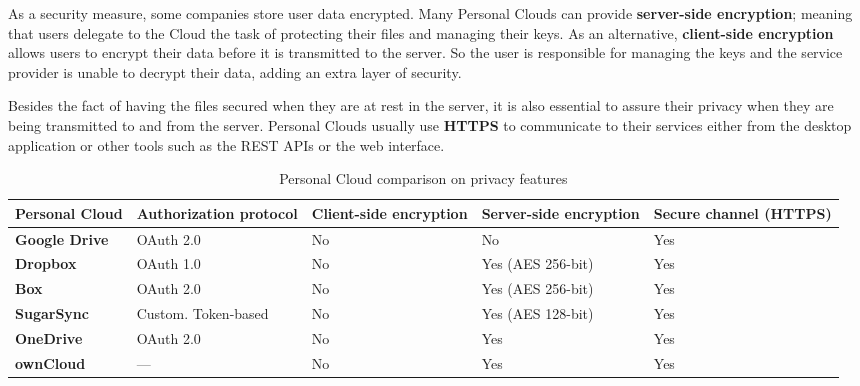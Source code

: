 As a security measure, some companies store user data encrypted. Many Personal Clouds can provide \textbf{server-side encryption}; meaning that users delegate to the Cloud the task of protecting their files and managing their keys. As an alternative, \textbf{client-side encryption} allows users to encrypt their data before it is transmitted to the server. So the user is responsible for managing the keys and the service provider is unable to decrypt their data, adding an extra layer of security.

Besides the fact of having the files secured when they are at rest in the server, it is also essential to assure their privacy when they are being transmitted to and from the server. Personal Clouds usually use \textbf{HTTPS} to communicate to their services either from the desktop application or other tools such as the REST APIs or the web interface.


{
\def\arraystretch{1.5}

\begin{table}
\begin{center}
    \begin{tabular}{ | p{3.3cm} | p{2.5cm} | p{2.2cm} | p{2.2cm} | p{2cm} | }
    \hline
    \rowcolor[gray]{0.8}

	\textbf{Personal Cloud} &
	\textbf{Authorization protocol} &
	\textbf{Client-side encryption} &
	\textbf{Server-side encryption} & 
	\textbf{Secure channel (HTTPS)} \\ \hline
	
	\textbf{Google Drive} &
	OAuth 2.0 &
	No &
	No &
	Yes \\ \hline

	\textbf{Dropbox} &
	OAuth 1.0 &
	No &
	Yes (AES 256-bit) &
	Yes \\ \hline
	
	\textbf{Box} &
	OAuth 2.0 &
	No &
	Yes (AES 256-bit) &
	Yes \\ \hline
	
	\textbf{SugarSync} & 
	Custom. Token-based &
	No &
	Yes (AES 128-bit) &
	Yes \\ \hline
	
	\textbf{OneDrive} & 
	OAuth 2.0 &
	No &
	Yes &
	Yes \\ \hline

	
	\textbf{ownCloud} &
	--- &
	No &
	Yes &
	Yes \\ \hline

    \end{tabular}
    \caption{Personal Cloud comparison on privacy features}
    \label{tab:pc_privacy}
\end{center}
\end{table}
}

